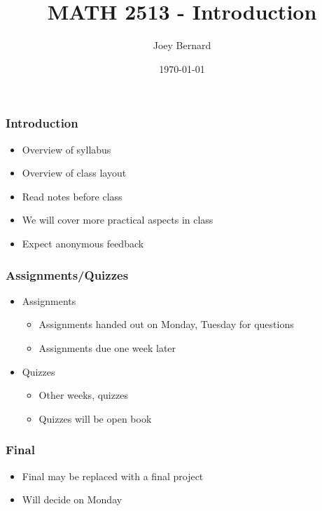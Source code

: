 \documentclass{beamer}
\title{MATH 2513 - Introduction}
\author{Joey Bernard}
\institute{University of New Brunswick}
\date{\today}
\begin{document}
\begin{frame}
  \titlepage
\end{frame}

\begin{frame}
  \frametitle{Introduction}
  \begin{itemize}
  \item Overview of syllabus
  \item Overview of class layout
  \item Read notes before class
  \item We will cover more practical aspects in class
  \item Expect anonymous feedback
  \end{itemize}
\end{frame}
\begin{frame}
  \frametitle{Assignments/Quizzes}
  \begin{itemize}
    \item Assignments
    \begin{itemize}
      \item Assignments handed out on Monday, Tuesday for questions
      \item Assignments due one week later
    \end{itemize}
  \item Quizzes
    \begin{itemize}
      \item Other weeks, quizzes
      \item Quizzes will be open book
    \end{itemize}
  \end{itemize}
\end{frame}
\begin{frame}
  \frametitle{Final}
  \begin{itemize}
  \item Final may be replaced with a final project
  \item Will decide on Monday
  \end{itemize}
\end{frame}
\end{document}
